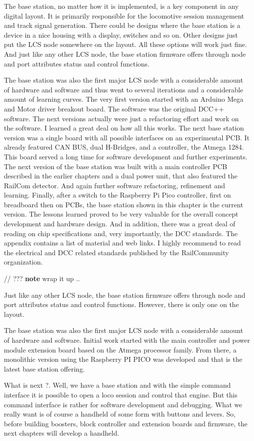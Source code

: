 The base station, no matter how it is implemented, is a key component in any digital layout. It is primarily responsible for the locomotive session management and track signal generation. There could be designs where the base station is a device in a nice housing with a display, switches and so on. Other designs just put the LCS node somewhere on the layout. All these options will work just fine. And just like any other LCS node, the base station firmware offers through node and port attributes status and control functions.

The base station was also the first major LCS node with a considerable amount of hardware and software and thus went to several iterations and a considerable amount of learning curves. The very first version started with an Arduino Mega and Motor driver breakout board. The software was the original DCC++ software. The next versions actually were just a refactoring effort and work on the software. I learned a great deal on how all this works. The next base station version was a single board with all possible interfaces on an experimental PCB. It already featured CAN BUS, dual H-Bridges, and a controller, the Atmega 1284. This board served a long time for software development and further experiments. The next version of the base station was built with a main controller PCB described in the earlier chapters and a dual power unit, that also featured the RailCom detector. And again further software refactoring, refinement and learning. Finally, after a switch to the Raspberry Pi Pico controller, first on breadboard  then on PCBs, the base station shown in this chapter is the current version. The lessons learned proved to be very valuable for the overall concept development and hardware design. And in addition, there was a great deal of reading on chip specifications and, very importantly, the DCC standards. The appendix contains a list of material and web links. I highly recommend to read the electrical and DCC related standards published by the RailCommunity organization.


// ??? \textbf{note} wrap it up ..

Just like any other LCS node, the base station firmware offers through node and port attributes status and control functions. However, there is only one on the layout.

The base station was also the first major LCS node with a considerable amount of hardware and software. Initial work started with the main controller and power module extension board based on the Atmega processor family. From there, a monolithic version using the Raspberry PI PICO was developed and that is the latest base station offering.

What is next ?. Well, we have a base station and with the simple command interface it is possible to open a loco session and control that engine. But this command interface is rather for software development and debugging. What we really want is of course a handheld of some form with buttons and levers. So, before building boosters, block controller and extension boards and firmware, the next chapters will develop a handheld. 

